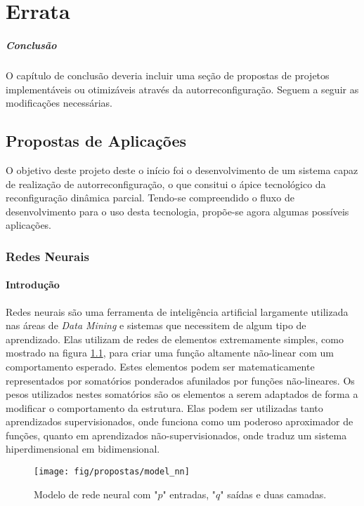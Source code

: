 ﻿%

\chapter{Errata}

\paragraph{Conclusão} O capítulo de conclusão deveria incluir uma seção de propostas de projetos implementáveis ou otimizáveis através da autorreconfiguração.
Seguem a seguir as modificações necessárias.

\section{Propostas de Aplicações}
O objetivo deste projeto deste o início foi o desenvolvimento de um sistema capaz de realização de autorreconfiguração, o que consitui o ápice tecnológico da reconfiguração dinâmica parcial.
Tendo-se compreendido o fluxo de desenvolvimento para o uso desta tecnologia, propõe-se agora algumas possíveis aplicações.

\subsection{Redes Neurais}
\subsubsection{Introdu\c{c}\~ao}
Redes neurais s\~ao uma ferramenta de inteligência artificial largamente utilizada nas \'areas de \textit{Data Mining} e sistemas que necessitem de algum tipo de aprendizado.
Elas utilizam de redes de elementos extremamente simples, como mostrado na figura \ref{fig:nn}, para criar uma fun\c{c}\~ao altamente n\~ao-linear com um comportamento esperado.
Estes elementos podem ser matematicamente representados por somat\'orios ponderados afunilados por fun\c{c}\~oes n\~ao-lineares.
Os pesos utilizados nestes somat\'orios s\~ao os elementos a serem adaptados de forma a modificar o comportamento da estrutura.
Elas podem ser utilizadas tanto aprendizados supervisionados, onde funciona como um poderoso aproximador de fun\c{c}\~oes, quanto em aprendizados n\~ao-supervisionados, onde traduz um sistema hiperdimensional em bidimensional.

\begin{figure}[h]
\centering
\texttt{[image: fig/propostas/model\_nn]}
\caption{Modelo de rede neural com "$p$" entradas, "$q$" saídas e duas camadas.}
\label{fig:nn}
\end{figure}

